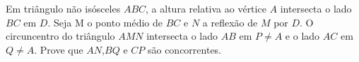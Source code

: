 Em triângulo não isósceles $ABC$, a altura relativa ao vértice $A$ intersecta o lado $BC$ em $D$. Seja M o ponto médio de $BC$ e $N$ a reflexão de $M$ por $D$. O circuncentro do triângulo $AMN$ intersecta o lado $AB$ em $P \ne A$ e o lado $AC$ em $Q \ne A$. Prove que $AN$,$BQ$ e $CP$ são concorrentes.